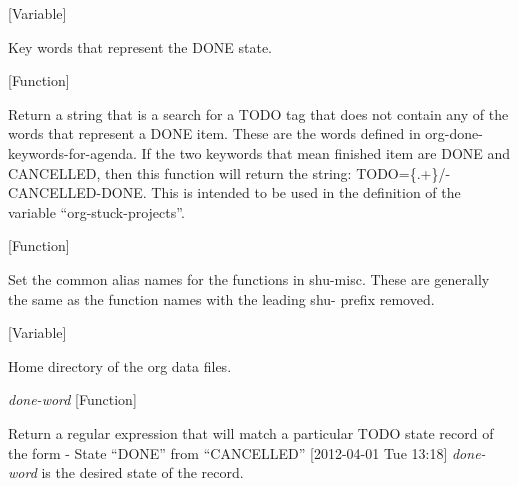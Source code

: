 \vspace{1em}
\noindent
{}
\usebox{\funcname}
 \hfill [Variable]

\begin{doc-string}
Key words that represent the DONE state.
\end{doc-string}

\vspace{1em}
\noindent
{}
\usebox{\funcname}
 \hfill [Function]

\begin{doc-string}
Return a string that is a search for a TODO tag that does not contain any of the
words that represent a DONE item.  These are the words defined in org-done-keywords-for-agenda.
If the two keywords that mean finished item are DONE and CANCELLED, then this function will
return the string: TODO=\{.+\}/-CANCELLED-DONE.  This is intended to be used in the definition
of the variable ``org-stuck-projects''.
\end{doc-string}

\vspace{1em}
\noindent
{}
\usebox{\funcname}
 \hfill [Function]

\begin{doc-string}
Set the common alias names for the functions in shu-misc.
These are generally the same as the function names with the leading
shu- prefix removed.
\end{doc-string}

\vspace{1em}
\noindent
{}
\usebox{\funcname}
 \hfill [Variable]

\begin{doc-string}
Home directory of the org data files.
\end{doc-string}

\vspace{1em}
\noindent
{}
\usebox{\funcname}\emph{done-word}
 \hfill [Function]

\begin{doc-string}
Return a regular expression that will match a particular TODO state record of the form
   - State ``DONE''       from ``CANCELLED''  [2012-04-01 Tue 13:18]
  \emph{done-word} is the desired state of the record.
\end{doc-string}

